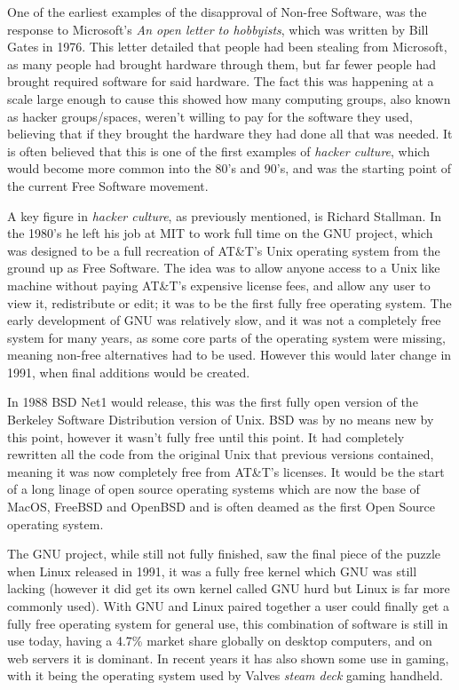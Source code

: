 \documentclass[a4paper,12pt]{article}
\begin{document}
{One of the earliest examples of the disapproval of Non-free Software, was the response to Microsoft's 
\textit{An open letter to hobbyists}, which was written by Bill Gates in 1976. This letter detailed 
that people had been stealing from Microsoft, as many people had brought hardware through 
them, but far fewer people had brought required software for said hardware. The fact this was happening 
at a scale large enough to cause this showed how many computing groups, also known as hacker groups/spaces, 
weren't willing to pay for the software they used, believing that if they brought the hardware they had done 
all that was needed\cite{OPENletter}. It is often believed that this is one of the first examples 
of \textit{hacker culture}, which would become more common into the 80's and 90's, and was the 
starting point of the current Free Software movement.

A key figure in \textit{hacker culture}, as previously mentioned, is Richard Stallman. In the 
 1980's he left his job at MIT to work full time on the GNU project, which was designed
to be a full recreation of AT\&T's Unix operating system from the ground up as Free Software. 
The idea was to allow anyone access to a Unix like machine without paying AT\&T's expensive license 
fees, and allow any user to view it, redistribute or edit; it was to be the first fully free 
operating system. The early development of GNU was relatively slow, and it was not a completely free 
system for many years, as some core parts of the operating system were missing, meaning non-free 
alternatives had to be used. However this would later change in 1991, when final additions would
be created.

In 1988 BSD Net1 would release\cite{BSDnet1}, this was the first fully open version of the Berkeley 
Software Distribution version of Unix. BSD was by no means new by this point, however it wasn't 
fully free until this point. It had completely rewritten all the code from the original 
Unix that previous versions contained, meaning it was now completely free from AT\&T's licenses.
It would be the start of a long linage of open source operating systems which are now the base
of MacOS, FreeBSD and OpenBSD and is often deamed as the first Open Source operating system.

The GNU project, while still not fully finished, saw the final piece of the puzzle when 
Linux\cite{LINUX} released in 1991, it was a fully free kernel which GNU was still lacking (however 
it did get its own kernel called GNU hurd but Linux is far more commonly used). With GNU and Linux 
paired together a user could finally get a fully free operating system for general use, this 
combination of software is still in use today, having a 4.7\% market share globally on desktop
computers\cite{LINUXmarket}, and on web servers it is dominant. In recent years it has also shown
some use in gaming, with it being the operating system used by Valves \textit{steam deck} gaming 
handheld\cite{STEAMdeck}.

}
\end{document}
